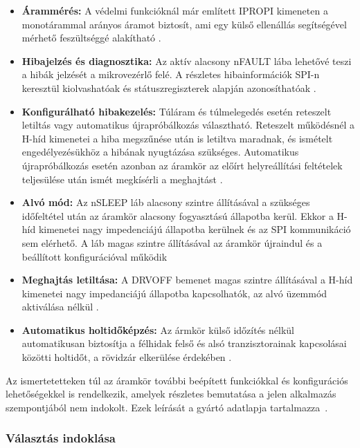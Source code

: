 \begin{itemize}
    \item \textbf{Árammérés:} A védelmi funkcióknál már említett IPROPI kimeneten a monotárammal arányos áramot biztosít, 
    ami egy külső ellenállás segítségével mérhető feszültséggé alakítható \cite[38.~o., 8.3.3.2]{drv8244}. 
    \item \textbf{Hibajelzés és diagnosztika:} Az aktív alacsony nFAULT lába lehetővé teszi a hibák jelzését a mikrovezérlő felé.
    A részletes hibainformációk SPI-n keresztül kiolvashatóak és státuszregiszterek alapján azonosíthatóak \cite[42.~o., 8.3.4]{drv8244}.
    \item \textbf{Konfigurálható hibakezelés:} Túláram és túlmelegedés esetén reteszelt letiltás vagy automatikus újrapróbálkozás választható.
    Reteszelt működésnél a H-híd kimenetei a hiba megszűnése után is letiltva maradnak, és ismételt engedélyezésükhöz 
    a hibának nyugtázása szükséges. Automatikus újrapróbálkozás esetén azonban az áramkör az előírt helyreállítási feltételek 
    teljesülése után ismét megkísérli a meghajtást \cite[42--43.~o., 8.3.4.1--8.3.4.2]{drv8244}.
    \item \textbf{Alvó mód:} Az nSLEEP láb alacsony szintre állításával a szükséges időfeltétel után az áramkör alacsony
    fogyasztású állapotba kerül. Ekkor a H-híd kimenetei nagy impedenciájú állapotba kerülnek és az SPI kommunikáció sem 
    elérhető. A láb magas szintre állításával az áramkör újraindul és a beállított konfigurációval működik  \cite[47--48.~o., 8.4--8.4.1]{drv8244}
    \item \textbf{Meghajtás letiltása:}   A DRVOFF bemenet magas szintre állításával a H-híd kimenetei nagy impedanciájú állapotba
    kapcsolhatók, az alvó üzemmód aktiválása nélkül \cite[9.~o., 6.2.1; 35.~o., 8.3.2]{drv8244}.
    \item \textbf{Automatikus holtidőképzés:} Az ármkör külső időzítés nélkül automatikusan biztosítja 
    a félhidak felső és alsó tranzisztorainak kapcsolásai közötti holtidőt, a rövidzár elkerülése érdekében \cite[35.~o., 8.3.2]{drv8244}.
\end{itemize}
Az ismertetetteken túl az áramkör további beépített funkciókkal és konfigurációs lehetőségekkel is rendelkezik,
amelyek részletes bemutatása a jelen alkalmazás szempontjából nem indokolt. Ezek leírását a gyártó adatlapja tartalmazza~\cite{drv8244}.


\subsubsection{Választás indoklása}


